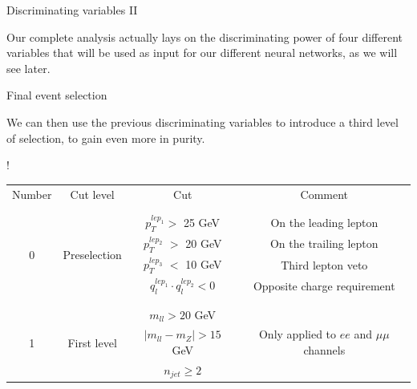 \documentclass[handout,8 pt]{beamer}
\begin{document}
\begin{frame}{Discriminating variables II}
\begin{minipage}[c]{.48\linewidth}
	\end{minipage} \vfill

	\begin{block}{}
	\justifying
	Our complete analysis actually lays on the discriminating power of four different variables that will be used as input for our different neural networks, as we will see later. \end{block} \vfill

\end{frame}


\begin{frame}{Final event selection}

	\justifying
	We can then use the previous discriminating variables to introduce a third level of selection, to gain even more in purity. \vfill 

	\hspace{4pt}
   \begin{minipage}[c]{.02\linewidth}
	\begin{exampleblock}{}  \end{exampleblock}
   \end{minipage}	
   \hspace{2pt}
   \begin{minipage}[c]{.97\linewidth}
   \begin{center}
   \resizebox{300pt} {!}{
   \begin{tabular}{c|c|c|c}
   Number & Cut level & Cut & Comment \\
   	& & & \\
   	\hline \hline
	& & & \\
	  \multirow{4}{*}{0} & \multirow{4}{*}{Preselection} & $p_{T}^{lep_1} >$ 25 GeV & On the leading lepton\\ 
	  & & $p_{T}^{lep_2}$ $>$ 20 GeV & On the trailing lepton \\ 
	  & & $p_{T}^{lep_3}$ $<$ 10 GeV &Third lepton veto \\ 
	  & & $q_{l}^{lep_1} \cdot q_{l}^{lep_2} < 0$ & Opposite charge requirement \\ 
	  & & & \\
	  \hline
	   & & & \\
	  \multirow{4}{*}{1} & \multirow{4}{*}{First level} & $m_{ll} > 20$ GeV &  \\
	  & & $|m_{ll} - m_Z| > 15$ GeV & Only applied to $ee$ and $\mu \mu$ channels \\
	  & & $n_{jet} \geq 2$ &  \\

\end{tabular}}
\end{center}
\end{minipage}
\end{frame}
\end{document}

